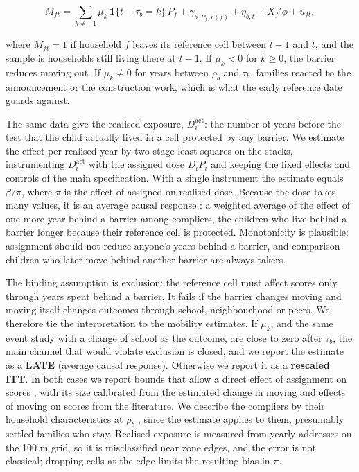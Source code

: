 \documentclass[11pt]{article}
\begin{document}
\[
M_{ft} = \sum_{k \neq -1} \mu_k\, \mathbf{1}\{t - \tau_b = k\}\, P_f + \gamma_{b,P_f,r(f)} + \eta_{b,t} + X_f'\phi + u_{ft},
\]

where \(M_{ft} = 1\) if household \(f\) leaves its reference cell between \(t-1\) and \(t\), and the sample is households still living there at \(t-1\). If \(\mu_k < 0\) for \(k \ge 0\), the barrier reduces moving out. If \(\mu_k \neq 0\) for years between \(\rho_b\) and \(\tau_b\), families reacted to the announcement or the construction work, which is what the early reference date guards against.

The same data give the realised exposure, \(D_i^{\text{act}}\): the number of years before the test that the child actually lived in a cell protected by any barrier. We estimate the effect per realised year by two-stage least squares on the stacks, instrumenting \(D_i^{\text{act}}\) with the assigned dose \(D_i P_i\) and keeping the fixed effects and controls of the main specification. With a single instrument the estimate equals \(\beta / \pi\), where \(\pi\) is the effect of assigned on realised dose. Because the dose takes many values, it is an average causal response \autocite{angristTwoStageLeastSquares1995}: a weighted average of the effect of one more year behind a barrier among compliers, the children who live behind a barrier longer because their reference cell is protected. Monotonicity is plausible: assignment should not reduce anyone's years behind a barrier, and comparison children who later move behind another barrier are always-takers.

The binding assumption is exclusion: the reference cell must affect scores only through years spent behind a barrier. It fails if the barrier changes moving and moving itself changes outcomes through school, neighbourhood or peers. We therefore tie the interpretation to the mobility estimates. If \(\mu_k\), and the same event study with a change of school as the outcome, are close to zero after \(\tau_b\), the main channel that would violate exclusion is closed, and we report the estimate as a \textbf{LATE} (average causal response). Otherwise we report it as a \textbf{rescaled ITT}. In both cases we report bounds that allow a direct effect of assignment on scores \autocite{conleyPlausiblyExogenous2012}, with its size calibrated from the estimated change in moving and effects of moving on scores from the literature. We describe the compliers by their household characteristics at \(\rho_b\) \autocite{abadieSemiparametricInstrumentalVariable2003}, since the estimate applies to them, presumably settled families who stay. Realised exposure is measured from yearly addresses on the 100 m grid, so it is misclassified near zone edges, and the error is not classical; dropping cells at the edge limits the resulting bias in \(\pi\).
\end{document}
